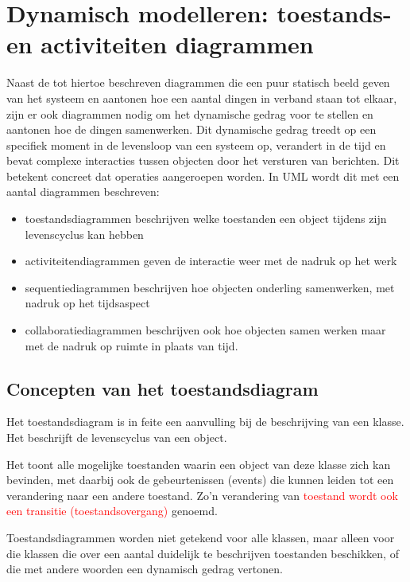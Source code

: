\section{Dynamisch modelleren: toestands- en activiteiten diagrammen}

Naast de tot hiertoe beschreven diagrammen die een puur statisch beeld geven van het systeem en aantonen hoe een aantal dingen in verband staan tot elkaar, zijn er ook diagrammen nodig om het dynamische gedrag voor te stellen en aantonen hoe de dingen samenwerken. Dit dynamische gedrag treedt op een specifiek moment in de levensloop van een systeem op, verandert in de tijd en bevat complexe interacties tussen objecten door het versturen van berichten. Dit betekent concreet dat operaties aangeroepen worden. In UML wordt dit met een aantal diagrammen beschreven:

\begin{itemize}
    \item toestandsdiagrammen beschrijven welke toestanden een object tijdens zijn levenscyclus kan hebben
    \item activiteitendiagrammen geven de interactie weer met de nadruk op het werk
    \item sequentiediagrammen beschrijven hoe objecten onderling samenwerken, met nadruk op het tijdsaspect
    \item collaboratiediagrammen beschrijven ook hoe objecten samen werken maar met de nadruk op ruimte in plaats van tijd.
\end{itemize}


\subsection{Concepten van het toestandsdiagram}

Het toestandsdiagram is in feite een aanvulling bij de beschrijving van een klasse. Het beschrijft de levenscyclus van een object. 

Het toont alle mogelijke toestanden waarin een object van deze klasse zich kan bevinden, met daarbij ook de gebeurtenissen (events) die kunnen leiden tot een verandering naar een andere toestand. Zo'n verandering van \textcolor{red}{toestand wordt ook een transitie (toestandsovergang)} genoemd. 

Toestandsdiagrammen worden niet getekend voor alle klassen, maar alleen voor die klassen die over een aantal duidelijk te beschrijven toestanden beschikken, of die met andere woorden een dynamisch gedrag vertonen. 

